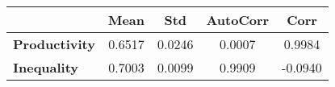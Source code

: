\begin{tiny}\begin{tabular}{|l|c|c|c|c|}
\hline
&\textbf{Mean}&\textbf{Std}&\textbf{AutoCorr}&\textbf{Corr}\\\hline
\textbf{Productivity}&0.6517&0.0246&0.0007&0.9984\\\hline
\textbf{Inequality}&0.7003&0.0099&0.9909&-0.0940\\\hline
\end{tabular}
\end{tiny}